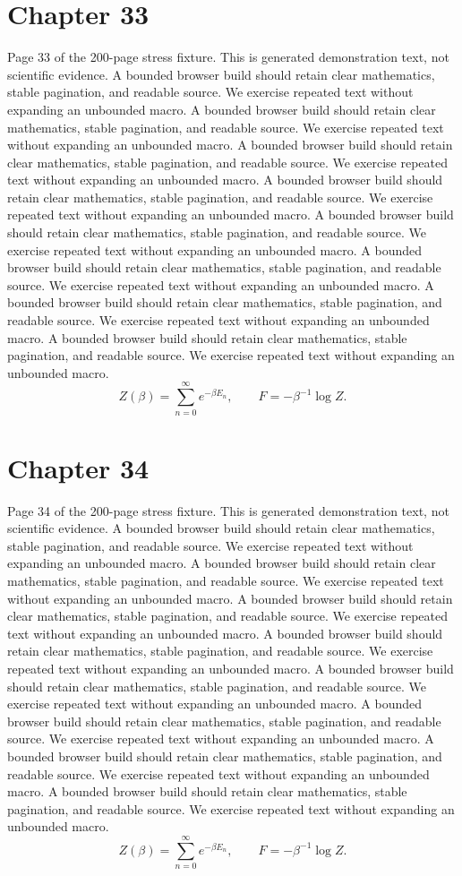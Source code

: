 \documentclass[11pt]{article}
\begin{document}
\section*{Chapter 33}
Page 33 of the 200-page stress fixture. This is generated demonstration text, not scientific evidence.
A bounded browser build should retain clear mathematics, stable pagination, and readable source. We exercise repeated text without expanding an unbounded macro.
A bounded browser build should retain clear mathematics, stable pagination, and readable source. We exercise repeated text without expanding an unbounded macro.
A bounded browser build should retain clear mathematics, stable pagination, and readable source. We exercise repeated text without expanding an unbounded macro.
A bounded browser build should retain clear mathematics, stable pagination, and readable source. We exercise repeated text without expanding an unbounded macro.
A bounded browser build should retain clear mathematics, stable pagination, and readable source. We exercise repeated text without expanding an unbounded macro.
A bounded browser build should retain clear mathematics, stable pagination, and readable source. We exercise repeated text without expanding an unbounded macro.
A bounded browser build should retain clear mathematics, stable pagination, and readable source. We exercise repeated text without expanding an unbounded macro.
A bounded browser build should retain clear mathematics, stable pagination, and readable source. We exercise repeated text without expanding an unbounded macro.
\[Z(\beta)=\sum_{n=0}^{\infty}e^{-\beta E_n},\qquad F=-\beta^{-1}\log Z.\]
\newpage
\section*{Chapter 34}
Page 34 of the 200-page stress fixture. This is generated demonstration text, not scientific evidence.
A bounded browser build should retain clear mathematics, stable pagination, and readable source. We exercise repeated text without expanding an unbounded macro.
A bounded browser build should retain clear mathematics, stable pagination, and readable source. We exercise repeated text without expanding an unbounded macro.
A bounded browser build should retain clear mathematics, stable pagination, and readable source. We exercise repeated text without expanding an unbounded macro.
A bounded browser build should retain clear mathematics, stable pagination, and readable source. We exercise repeated text without expanding an unbounded macro.
A bounded browser build should retain clear mathematics, stable pagination, and readable source. We exercise repeated text without expanding an unbounded macro.
A bounded browser build should retain clear mathematics, stable pagination, and readable source. We exercise repeated text without expanding an unbounded macro.
A bounded browser build should retain clear mathematics, stable pagination, and readable source. We exercise repeated text without expanding an unbounded macro.
A bounded browser build should retain clear mathematics, stable pagination, and readable source. We exercise repeated text without expanding an unbounded macro.
\[Z(\beta)=\sum_{n=0}^{\infty}e^{-\beta E_n},\qquad F=-\beta^{-1}\log Z.\]
\newpage
\end{document}
